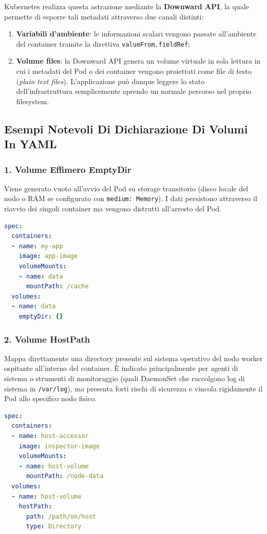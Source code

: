 \documentclass[11pt, a4paper]{article}
\begin{document}
Kubernetes realizza questa astrazione mediante la \textbf{Downward API}, la quale permette di esporre tali metadati attraverso due canali distinti:
\begin{enumerate}[noitemsep]
    \item \textbf{Variabili d'ambiente}: le informazioni scalari vengono passate all'ambiente del container tramite la direttiva \texttt{valueFrom.fieldRef};
    \item \textbf{Volume files}: la Downward API genera un volume virtuale in sola lettura in cui i metadati del Pod o dei container vengono proiettati come file di testo (\emph{plain text files}). L'applicazione può dunque leggere lo stato dell'infrastruttura semplicemente aprendo un normale percorso nel proprio filesystem.
\end{enumerate}

\subsection{Esempi Notevoli Di Dichiarazione Di Volumi In YAML}

\subsubsection{1. Volume Effimero EmptyDir}
Viene generato vuoto all'avvio del Pod su storage transitorio (disco locale del nodo o RAM se configurato con \texttt{medium: Memory}). I dati persistono attraverso il riavvio dei singoli container ma vengono distrutti all'arresto del Pod.
\begin{lstlisting}[language=yaml, caption={Dichiarazione e montaggio di un volume \texttt{emptyDir}.}]
spec:
  containers:
  - name: my-app
    image: app-image
    volumeMounts:
    - name: data
      mountPath: /cache
  volumes:
  - name: data
    emptyDir: {}
\end{lstlisting}

\subsubsection{2. Volume HostPath}
Mappa direttamente una directory presente sul sistema operativo del nodo worker ospitante all'interno del container. È indicato principalmente per agenti di sistema o strumenti di monitoraggio (quali DaemonSet che raccolgono log di sistema in \texttt{/var/log}), ma presenta forti rischi di sicurezza e vincola rigidamente il Pod allo specifico nodo fisico.
\begin{lstlisting}[language=yaml, caption={Dichiarazione e montaggio di un volume \texttt{hostPath}.}]
spec:
  containers:
  - name: host-accessor
    image: inspector-image
    volumeMounts:
    - name: host-volume
      mountPath: /node-data
  volumes:
  - name: host-volume
    hostPath:
      path: /path/on/host
      type: Directory
\end{lstlisting}
\end{document}
